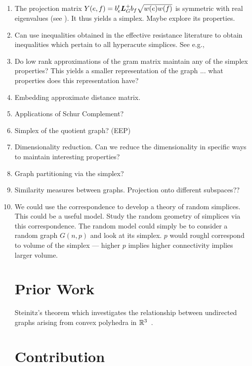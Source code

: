 \begin{enumerate}
	\item The projection matrix $Y(e,f)=b_e^t \vb*{L}_G^+b_f\sqrt{w(e)w(f)}$ is symmetric with real eigenvalues (see \cite{vishnoi2013lx}). It thus yields a simplex. Maybe explore its properties. 
	\item Can use inequalities obtained in the effective resistance literature to obtain inequalities which pertain to all hyperacute simplices. See e.g.,\cite{alev2017graph} 
\item Do low rank approximations of the gram matrix maintain any of the simplex properties? This yields a smaller representation of the graph ... what properties does this representation have?
\item Embedding approximate distance matrix. 
\item Applications of Schur Complement? 
    \item Simplex of the quotient graph? (EEP)

    \item Dimensionality reduction. Can we reduce the dimensionality in specific ways to maintain interesting properties? 
    \item Graph partitioning via the simplex? 
    \item Similarity measures between graphs. Projection onto different subspaces??
         
    \item We could use the correspondence to develop a theory of random simplices. This could be a useful model. Study the random geometry of simplices via this correspondence. The random model could simply be to consider a random graph $G(n,p)$ and look at its simplex. $p$ would roughl correspond to volume of the simplex --- higher $p$ implies higher connectivity implies larger volume. 
    
    \section{Prior Work}
    
	Steinitz's theorem which investigates the relationship between undirected graphs arising from convex polyhedra in $\mathbb{R}^3$~\cite{steinitz1922polyeder}. 
    
    \section{Contribution}
   
\end{enumerate}

